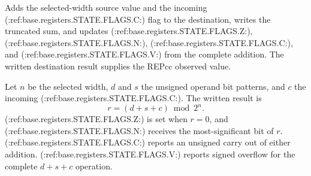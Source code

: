 Adds the selected-width source value and the incoming (:ref:base.registers.STATE.FLAGS.C:) flag to the destination, writes the truncated sum, and updates (:ref:base.registers.STATE.FLAGS.Z:), (:ref:base.registers.STATE.FLAGS.N:), (:ref:base.registers.STATE.FLAGS.C:), and (:ref:base.registers.STATE.FLAGS.V:) from the complete addition. The written destination result supplies the REPcc observed value.


Let \(n\) be the selected width, \(d\) and \(s\) the unsigned operand bit patterns, and \(c\) the incoming (:ref:base.registers.STATE.FLAGS.C:). The written result is
\[
  r = (d + s + c) \bmod 2^n .
\]
(:ref:base.registers.STATE.FLAGS.Z:) is set when \(r=0\), and (:ref:base.registers.STATE.FLAGS.N:) receives the most-significant bit of \(r\). (:ref:base.registers.STATE.FLAGS.C:) reports an unsigned carry out of either addition. (:ref:base.registers.STATE.FLAGS.V:) reports signed overflow for the complete \(d+s+c\) operation.
